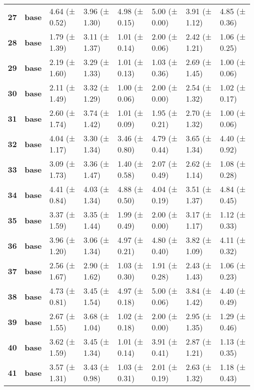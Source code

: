 \begin{longtable}{llllllll}
\cline{1-8}
\textbf{27} & \textbf{base} & 4.64 (± 0.52) & 3.96 (± 1.30) & 4.98 (± 0.15) & 5.00 (± 0.00) & 3.91 (± 1.12) & 4.85 (± 0.36) \\
\cline{1-8}
\textbf{28} & \textbf{base} & 1.79 (± 1.39) & 3.11 (± 1.37) & 1.01 (± 0.14) & 2.00 (± 0.06) & 2.42 (± 1.21) & 1.06 (± 0.25) \\
\cline{1-8}
\textbf{29} & \textbf{base} & 2.19 (± 1.60) & 3.29 (± 1.33) & 1.01 (± 0.13) & 1.03 (± 0.36) & 2.69 (± 1.45) & 1.00 (± 0.06) \\
\cline{1-8}
\textbf{30} & \textbf{base} & 2.11 (± 1.49) & 3.32 (± 1.29) & 1.00 (± 0.06) & 2.00 (± 0.00) & 2.54 (± 1.32) & 1.02 (± 0.17) \\
\cline{1-8}
\textbf{31} & \textbf{base} & 2.60 (± 1.74) & 3.74 (± 1.42) & 1.01 (± 0.09) & 1.95 (± 0.21) & 2.70 (± 1.32) & 1.00 (± 0.06) \\
\cline{1-8}
\textbf{32} & \textbf{base} & 4.04 (± 1.17) & 3.30 (± 1.34) & 3.46 (± 0.80) & 4.79 (± 0.44) & 3.65 (± 1.34) & 4.40 (± 0.92) \\
\cline{1-8}
\textbf{33} & \textbf{base} & 3.09 (± 1.73) & 3.36 (± 1.47) & 1.40 (± 0.58) & 2.07 (± 0.49) & 2.62 (± 1.14) & 1.08 (± 0.28) \\
\cline{1-8}
\textbf{34} & \textbf{base} & 4.41 (± 0.84) & 4.03 (± 1.34) & 4.88 (± 0.50) & 4.04 (± 0.19) & 3.51 (± 1.37) & 4.84 (± 0.45) \\
\cline{1-8}
\textbf{35} & \textbf{base} & 3.37 (± 1.59) & 3.35 (± 1.44) & 1.99 (± 0.49) & 2.00 (± 0.00) & 3.17 (± 1.17) & 1.12 (± 0.33) \\
\cline{1-8}
\textbf{36} & \textbf{base} & 3.96 (± 1.20) & 3.06 (± 1.34) & 4.97 (± 0.21) & 4.80 (± 0.40) & 3.82 (± 1.09) & 4.11 (± 0.32) \\
\cline{1-8}
\textbf{37} & \textbf{base} & 2.56 (± 1.67) & 2.90 (± 1.62) & 1.03 (± 0.30) & 1.91 (± 0.28) & 2.43 (± 1.43) & 1.06 (± 0.23) \\
\cline{1-8}
\textbf{38} & \textbf{base} & 4.73 (± 0.81) & 3.45 (± 1.54) & 4.97 (± 0.18) & 5.00 (± 0.06) & 3.84 (± 1.42) & 4.40 (± 0.49) \\
\cline{1-8}
\textbf{39} & \textbf{base} & 2.67 (± 1.55) & 3.68 (± 1.04) & 1.02 (± 0.18) & 2.00 (± 0.00) & 2.95 (± 1.35) & 1.29 (± 0.46) \\
\cline{1-8}
\textbf{40} & \textbf{base} & 3.62 (± 1.59) & 3.45 (± 1.34) & 1.01 (± 0.14) & 3.91 (± 0.41) & 2.87 (± 1.21) & 1.13 (± 0.35) \\
\cline{1-8}
\textbf{41} & \textbf{base} & 3.57 (± 1.31) & 3.43 (± 0.98) & 1.03 (± 0.31) & 2.01 (± 0.19) & 2.63 (± 1.32) & 1.18 (± 0.43) \\

\end{longtable}
